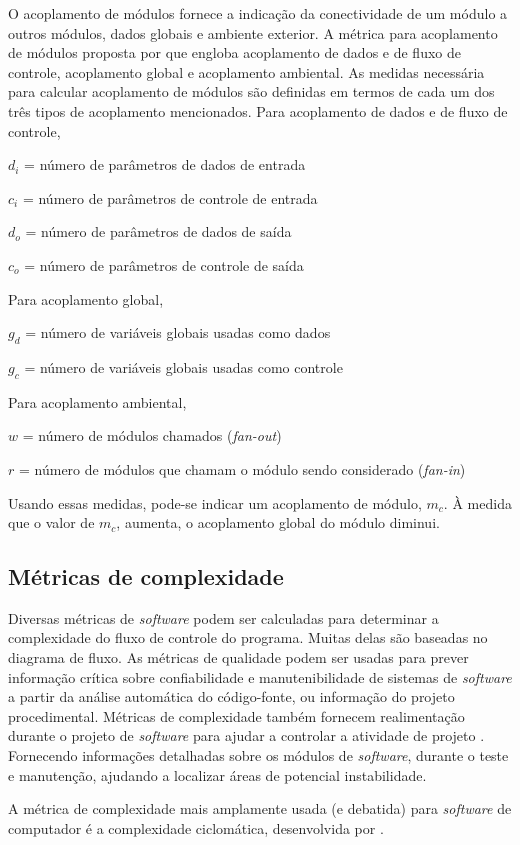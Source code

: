O acoplamento de módulos fornece a indicação da conectividade de um módulo a outros módulos, dados globais e ambiente exterior.
A métrica para acoplamento de módulos proposta por  que engloba acoplamento de dados e de fluxo de controle, acoplamento global e acoplamento ambiental. As medidas necessária para calcular acoplamento de módulos são definidas em termos de cada um dos três tipos de acoplamento mencionados.
Para acoplamento de dados e de fluxo de controle,
\begin{description}
	\item$d_i$ = número de parâmetros de dados de entrada
	\item$c_i$ = número de parâmetros de controle de entrada
	\item$d_o$ = número de parâmetros de dados de saída
	\item$c_o$ = número de parâmetros de controle de saída
\end{description}
Para acoplamento global,
\begin{description}
	\item$g_d$ = número de variáveis globais usadas como dados
	\item$g_c$ = número de variáveis globais usadas como controle
\end{description}
Para acoplamento ambiental,
\begin{description}
	\item$w$ = número de módulos chamados (\textit{fan-out})
	\item$r$ = número de módulos que chamam o módulo sendo considerado (\textit{fan-in})
\end{description}

Usando essas medidas, pode-se indicar um acoplamento de módulo, $m_c$. À medida que o valor de $m_c$, aumenta, o acoplamento global do módulo diminui.

\subsection{Métricas de complexidade}

Diversas métricas de \textit{software} podem ser calculadas para determinar a complexidade do fluxo de controle do programa. Muitas delas são baseadas no diagrama de fluxo.
As métricas de qualidade podem ser usadas para prever informação crítica sobre confiabilidade e manutenibilidade de sistemas de \textit{software} a partir da análise automática do código-fonte, ou informação do projeto procedimental. Métricas de complexidade também fornecem realimentação durante o projeto de \textit{software} para ajudar a controlar a atividade de projeto \cite{Pressman:2010}. Fornecendo informações detalhadas sobre os módulos de \textit{software}, durante o teste e manutenção, ajudando a localizar áreas de potencial instabilidade.

A métrica de complexidade mais amplamente usada (e debatida) para \textit{software} de computador é a complexidade ciclomática, desenvolvida por .